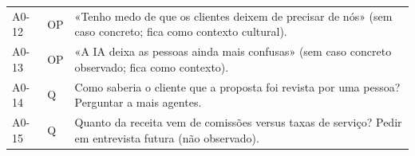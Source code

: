\documentclass[11pt,a4paper]{article}
\begin{document}
{\begin{longtable}{@{}p{1.5cm}p{1.1cm}p{11.8cm}@{}}
A0-12 & OP & «Tenho medo de que os clientes deixem de precisar de nós» (sem caso concreto; fica como contexto cultural). \\
A0-13 & OP & «A IA deixa as pessoas ainda mais confusas» (sem caso concreto observado; fica como contexto). \\
A0-14 & Q & Como saberia o cliente que a proposta foi revista por uma pessoa? Perguntar a mais agentes. \\
A0-15 & Q & Quanto da receita vem de comissões versus taxas de serviço? Pedir em entrevista futura (não observado). \\
\bottomrule
\end{longtable}}
\end{document}

